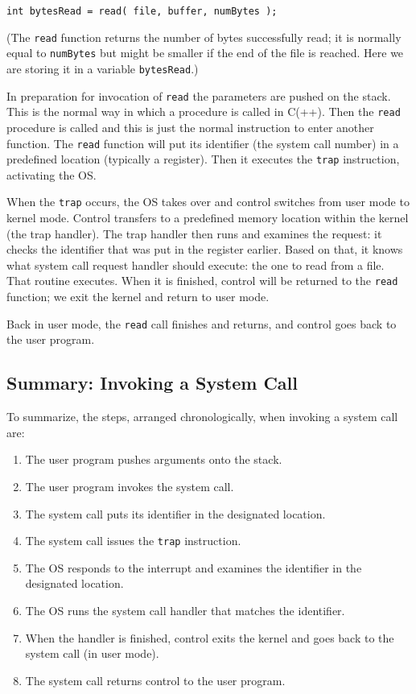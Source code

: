 \begin{verbatim}
int bytesRead = read( file, buffer, numBytes );
\end{verbatim}

(The \texttt{read} function returns the number of bytes successfully read; it is normally equal to \texttt{numBytes} but might be smaller if the end of the file is reached. Here we are storing it in a variable \texttt{bytesRead}.)

In preparation for invocation of \texttt{read} the parameters are pushed on the stack. This is the normal way in which a procedure is called in C(++). Then the \texttt{read} procedure is called and this is just the normal instruction to enter another function. The \texttt{read} function will put its identifier (the system call number) in a predefined location (typically a register). Then it executes the \texttt{trap} instruction, activating the OS.

When the \texttt{trap} occurs, the OS takes over and control switches from user mode to kernel mode. Control transfers to a predefined memory location within the kernel (the trap handler). The trap handler then runs and examines the request: it checks the identifier that was put in the register earlier. Based on that, it knows what system call request handler should execute: the one to read from a file. That routine executes. When it is finished, control will be returned to the \texttt{read} function; we exit the kernel and return to user mode.

Back in user mode, the \texttt{read} call finishes and returns, and control goes back to the user program.

\subsection*{Summary: Invoking a System Call}

To summarize, the steps, arranged chronologically, when invoking a system call are:
\begin{enumerate}
	\item The user program pushes arguments onto the stack.
	\item The user program invokes the system call.
	\item The system call puts its identifier in the designated location.
	\item The system call issues the \texttt{trap} instruction.
	\item The OS responds to the interrupt and examines the identifier in the designated location.
	\item The OS runs the system call handler that matches the identifier.
	\item When the handler is finished, control exits the kernel and goes back to the system call (in user mode).
	\item The system call returns control to the user program.

\end{enumerate}








